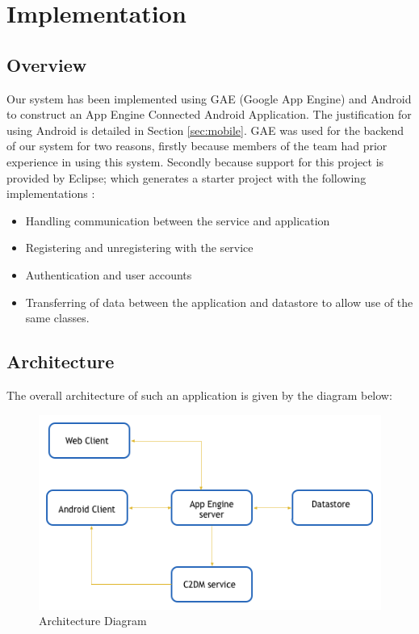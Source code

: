 \section{Implementation}

\subsection{Overview}
Our system has been implemented using GAE (Google App Engine) and Android to construct an App Engine Connected Android Application.  
The justification for using Android is detailed in Section \ref{sec:mobile}.
GAE was used for the backend of our system for two reasons, firstly because members of the team had prior experience in using this system. 
Secondly because support for this project is provided by Eclipse; which generates a starter project with the following implementations \cite{AppEngine}:
\begin{itemize}
	\item{Handling communication between the service and application}
	\item{Registering and unregistering with the service}
	\item{Authentication and user accounts}
	\item{Transferring of data between the application and datastore to allow use of the same classes}.
\end{itemize}

\subsection{Architecture}
The overall architecture of such an application is given by the diagram below:

\begin{figure}[ht]
\begin{center}
\includegraphics[trim = 0mm 0mm 0mm 0mm, clip, scale=0.7]{images/arch.png}
\caption{Architecture Diagram \cite{AppEngine}} 
\end{center}
\end{figure}

